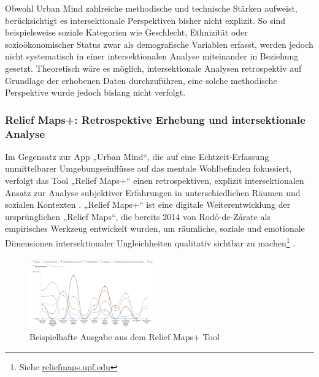 Obwohl Urban Mind zahlreiche methodische und technische Stärken aufweist, berücksichtigt es intersektionale Perspektiven bisher nicht explizit. So sind beispielsweise soziale Kategorien wie Geschlecht, Ethnizität oder sozioökonomischer Status zwar als demografische Variablen erfasst, werden jedoch nicht systematisch in einer intersektionalen Analyse miteinander in Beziehung gesetzt. Theoretisch wäre es möglich, intersektionale Analysen retrospektiv auf Grundlage der erhobenen Daten durchzuführen, eine solche methodische Perspektive wurde jedoch bislang nicht verfolgt.



\subsubsection{Relief Maps+: Retrospektive Erhebung und intersektionale Analyse}

Im Gegensatz zur App „Urban Mind“, die auf eine Echtzeit-Erfassung unmittelbarer Umgebungseinflüsse auf das mentale Wohlbefinden fokussiert, verfolgt das Tool „Relief Maps+“ einen retrospektiven, explizit intersektionalen Ansatz zur Analyse subjektiver Erfahrungen in unterschiedlichen Räumen und sozialen Kontexten \parencite{rodo-de-zarateDevelopingGeographiesIntersectionality2014, font-casasecaMarginsGeographicalInformation2024}. „Relief Maps+“ ist eine digitale Weiterentwicklung der ursprünglichen „Relief Maps“, die bereits 2014 von Rodó-de-Zárate als empirisches Werkzeug entwickelt wurden, um räumliche, soziale und emotionale Dimensionen intersektionaler Ungleichheiten qualitativ sichtbar zu machen\footnote{Siehe \href{https://reliefmaps.upf.edu/}{reliefmaps.upf.edu}} \parencite{rodo-de-zarateDevelopingGeographiesIntersectionality2014, luizdesouzaSpiralValidationProcess2025}.


\begin{figure}[htbp]
    \centering
    \includegraphics[width=0.5\textwidth]{Arbeit/images/reliefmap.png}
    \caption{Beispielhafte Ausgabe aus dem Relief Maps+ Tool}
    \label{fig:relief_maps_plus_screenshot_1}
\end{figure}

